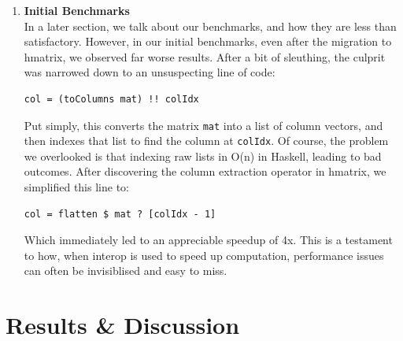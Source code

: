 \documentclass[12pt, titlepage]{article}
\begin{document}
\begin{enumerate}
	\item \textbf{Initial Benchmarks}\\
	In a later section, we talk about our benchmarks, and how they are less than satisfactory. However, in our initial benchmarks, even after the migration to hmatrix, we observed far worse results. After a bit of sleuthing, the culprit was narrowed down to an unsuspecting line of code:
	\begin{lstlisting}
col = (toColumns mat) !! colIdx
	\end{lstlisting}
	Put simply, this converts the matrix \verb|mat| into a list of column vectors, and then indexes that list to find the column at \verb|colIdx|. Of course, the problem we overlooked is that indexing raw lists in O(n) in Haskell, leading to bad outcomes. After discovering the column extraction operator in hmatrix, we simplified this line to:
	\begin{lstlisting}
col = flatten $ mat ? [colIdx - 1]
	\end{lstlisting}
	Which immediately led to an appreciable speedup of 4x. This is a testament to how, when interop is used to speed up computation, performance issues can often be invisiblised and easy to miss.
\end{enumerate}

\section{Results \& Discussion}
\end{document}
